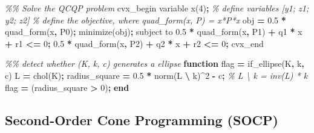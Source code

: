 \documentclass[
]{book}
\newenvironment{Shaded}{\begin{snugshade}}{\end{snugshade}}
\newcommand{\CommentTok}[1]{\textcolor[rgb]{0.56,0.35,0.01}{\textit{#1}}}
\newcommand{\FloatTok}[1]{\textcolor[rgb]{0.00,0.00,0.81}{#1}}
\newcommand{\KeywordTok}[1]{\textcolor[rgb]{0.13,0.29,0.53}{\textbf{#1}}}
\newcommand{\NormalTok}[1]{#1}
\newcommand{\OperatorTok}[1]{\textcolor[rgb]{0.81,0.36,0.00}{\textbf{#1}}}
\newcommand{\VariableTok}[1]{\textcolor[rgb]{0.00,0.00,0.00}{#1}}
\theoremstyle{definition}
\theoremstyle{definition}
\theoremstyle{definition}
\theoremstyle{definition}
\theoremstyle{remark}
\begin{document}
\begin{Shaded}
\begin{Highlighting}[]
\CommentTok{\%\% Solve the QCQP problem}
\VariableTok{cvx\_begin}
    \VariableTok{variable} \VariableTok{x}\NormalTok{(}\FloatTok{4}\NormalTok{)}\OperatorTok{;} \CommentTok{\% define variables [y1; z1; y2; z2]}
    \CommentTok{\% define the objective, where quad\_form(x, P) = x\textquotesingle{}*P*x}
    \VariableTok{obj} \OperatorTok{=} \FloatTok{0.5} \OperatorTok{*} \VariableTok{quad\_form}\NormalTok{(}\VariableTok{x}\OperatorTok{,} \VariableTok{P0}\NormalTok{)}\OperatorTok{;} 
    \VariableTok{minimize}\NormalTok{(}\VariableTok{obj}\NormalTok{)}\OperatorTok{;} 
    \VariableTok{subject} \VariableTok{to}
        \FloatTok{0.5} \OperatorTok{*} \VariableTok{quad\_form}\NormalTok{(}\VariableTok{x}\OperatorTok{,} \VariableTok{P1}\NormalTok{) }\OperatorTok{+} \VariableTok{q1}\OperatorTok{\textquotesingle{}} \OperatorTok{*} \VariableTok{x} \OperatorTok{+} \VariableTok{r1} \OperatorTok{\textless{}=} \FloatTok{0}\OperatorTok{;}
        \FloatTok{0.5} \OperatorTok{*} \VariableTok{quad\_form}\NormalTok{(}\VariableTok{x}\OperatorTok{,} \VariableTok{P2}\NormalTok{) }\OperatorTok{+} \VariableTok{q2}\OperatorTok{\textquotesingle{}} \OperatorTok{*} \VariableTok{x} \OperatorTok{+} \VariableTok{r2} \OperatorTok{\textless{}=} \FloatTok{0}\OperatorTok{;}
\VariableTok{cvx\_end}

\CommentTok{\%\% detect whether (K, k, c) generates a ellipse}
\KeywordTok{function} \VariableTok{flag} \OperatorTok{=} \VariableTok{if\_ellipse}\NormalTok{(}\VariableTok{K}\OperatorTok{,} \VariableTok{k}\OperatorTok{,} \VariableTok{c}\NormalTok{)}
    \VariableTok{L} \OperatorTok{=} \VariableTok{chol}\NormalTok{(}\VariableTok{K}\NormalTok{)}\OperatorTok{;}
    \VariableTok{radius\_square} \OperatorTok{=} \FloatTok{0.5} \OperatorTok{*} \VariableTok{norm}\NormalTok{(}\VariableTok{L} \OperatorTok{\textbackslash{}} \VariableTok{k}\NormalTok{)}\OperatorTok{\^{}}\FloatTok{2} \OperatorTok{{-}} \VariableTok{c}\OperatorTok{;} \CommentTok{\% L \textbackslash{} k = inv(L) * k}
    \VariableTok{flag} \OperatorTok{=}\NormalTok{ (}\VariableTok{radius\_square} \OperatorTok{\textgreater{}} \FloatTok{0}\NormalTok{)}\OperatorTok{;}
\KeywordTok{end}
\end{Highlighting}
\end{Shaded}

\subsection{Second-Order Cone Programming (SOCP)}\label{second-order-cone-programming-socp}
\end{document}
